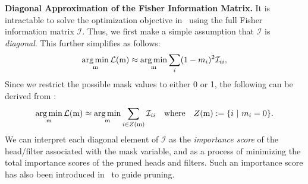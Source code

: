 \textbf{Diagonal Approximation of the Fisher Information Matrix.}
It is intractable to solve the optimization objective in~ using the full Fisher information matrix $\mathcal{I}$.
Thus, we first make a simple assumption that $\mathcal{I}$ is \textit{diagonal}.
This further simplifies  as follows:
\begin{gather}
    \operatorname*{arg\,min}_{\text{m}} {\mathcal{L}}(\text{m}) \approx \operatorname*{arg\,min}_{\text{m}} \sum_i (1 - m_i)^2 \mathcal{I}_{ii}, \label{eq:argmin_importance}
\end{gather}
Since we restrict the possible mask values to either 0 or 1, the following can be derived from :
\begin{gather}
    \operatorname*{arg\,min}_{\text{m}} {\mathcal{L}}(\text{m}) \approx \operatorname*{arg\,min}_{\text{m}} \sum_{i \in Z(\text{m})} \mathcal{I}_{ii} \label{eq:sum_importance} \quad
    \text{where} \quad Z(\text{m}) := \{i \ | \ m_i = 0 \}.
\end{gather}
We can interpret each diagonal element of $\mathcal{I}$ as the \textit{importance score} of the head/filter associated with the mask variable,
and  as a process of minimizing the total importance scores of the pruned heads and filters.
Such an importance score has also been introduced in~\cite{molchanov2019importance, theis2018faster} to guide pruning.

